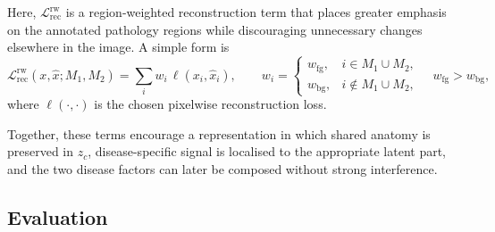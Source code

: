 Here, $\mathcal{L}_{\mathrm{rec}}^{\mathrm{rw}}$ is a region-weighted reconstruction term that places greater emphasis on the annotated pathology regions while discouraging unnecessary changes elsewhere in the image. A simple form is
\begin{equation}
\mathcal{L}_{\mathrm{rec}}^{\mathrm{rw}}(x,\hat{x};M_1,M_2)
=
\sum_i w_i \, \ell(x_i,\hat{x}_i),
\qquad
w_i =
\begin{cases}
w_{\mathrm{fg}}, & i \in M_1 \cup M_2, \\
w_{\mathrm{bg}}, & i \notin M_1 \cup M_2,
\end{cases}
\quad
w_{\mathrm{fg}} > w_{\mathrm{bg}},
\end{equation}
where $\ell(\cdot,\cdot)$ is the chosen pixelwise reconstruction loss. 

Together, these terms encourage a representation in which shared anatomy is preserved in $z_c$, disease-specific signal is localised to the appropriate latent part, and the two disease factors can later be composed without strong interference.


\subsection{Evaluation}
\label{subsec:p3_eval}

